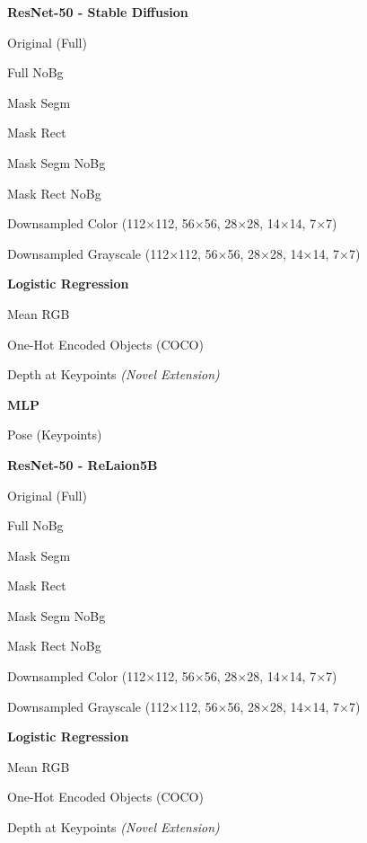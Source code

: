 \documentclass{article}
\newcommand{\done}{\textcolor{green}{$\checkmark$}}    %
\newcommand{\todo}{\textcolor{red}{$\square$}}          %
\newcommand{\tbadded}{\textcolor{orange}{$\square$}}    %
\begin{document}
	\noindent\textbf{ResNet-50 - Stable Diffusion}
	\begin{checklist}
		\item[\done] Original (Full)
		\item[\done] Full NoBg
		\item[\done] Mask Segm
		\item[\done] Mask Rect
		\item[\done] Mask Segm NoBg
		\item[\done] Mask Rect NoBg
		\item[\tbadded] Downsampled Color (112$\times$112, 56$\times$56, 28$\times$28, 14$\times$14, 7$\times$7)
		\item[\tbadded] Downsampled Grayscale (112$\times$112, 56$\times$56, 28$\times$28, 14$\times$14, 7$\times$7)
	\end{checklist}
	
	\textbf{Logistic Regression}
	\begin{checklist}
		\item[\done] Mean RGB
		\item[\done] One-Hot Encoded Objects (COCO)
		\item[\done] Depth at Keypoints \textit{(Novel Extension)}
	\end{checklist}
	
	\textbf{MLP}
	\begin{checklist}
		\item[\todo] Pose (Keypoints)
	\end{checklist}
	
	\noindent\textbf{ResNet-50 - ReLaion5B}
	\begin{checklist}
		\item[\done] Original (Full)
		\item[\todo] Full NoBg
		\item[\todo] Mask Segm
		\item[\todo] Mask Rect
		\item[\todo] Mask Segm NoBg
		\item[\todo] Mask Rect NoBg
		\item[\tbadded] Downsampled Color (112$\times$112, 56$\times$56, 28$\times$28, 14$\times$14, 7$\times$7)
		\item[\tbadded] Downsampled Grayscale (112$\times$112, 56$\times$56, 28$\times$28, 14$\times$14, 7$\times$7)
	\end{checklist}
	
	\textbf{Logistic Regression}
	\begin{checklist}
		\item[\todo] Mean RGB
		\item[\todo] One-Hot Encoded Objects (COCO)
		\item[\todo] Depth at Keypoints \textit{(Novel Extension)}
	\end{checklist}
	
\end{document}
